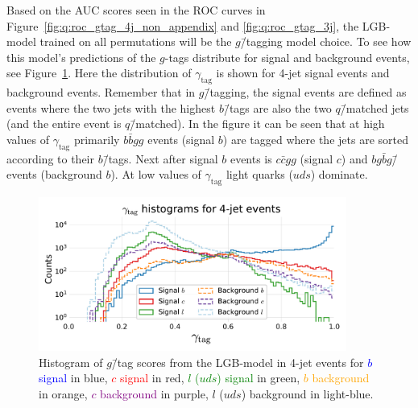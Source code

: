 Based on the AUC scores seen in the ROC curves in Figure~\ref{fig:q:roc_gtag_4j_non_appendix} and \ref{fig:q:roc_gtag_3j}, the LGB-model trained on all permutations will be the $g$\=/tagging model choice. To see how this model's predictions of the $g$-tags distribute for signal and background events, see Figure~\ref{fig:q:gtag_scores_4j_sig_bkg}. Here the distribution of $\gamma_\mathrm{tag}$ is shown for 4-jet signal events and background events. Remember that in $g$\=/tagging, the signal events are defined as events where the two jets with the highest $b$\=/tags are also the two $q$\=/matched jets (and the entire event is $q$\=/matched). In the figure it can be seen that at high values of $\gamma_\mathrm{tag}$ primarily $b\bar{b}gg$ events (signal $b$) are tagged where the jets are sorted according to their $b$\=/tags. Next after signal $b$ events is $c\bar{c}gg$ (signal $c$) and $bg\bar{b}g$\=/events (background $b$). At low values of $\gamma_\mathrm{tag}$ light quarks ($uds$) dominate. 

\begin{figure}[h!]
  \centerfloat
  \includegraphics[width=0.9\textwidth, trim=10 10 10 45, clip]{figures/quarks/gtag-histogram-sigbkg-down_sample=1.00-ML_vars=vertex-selection=b-ejet_min=4-n_iter_RS_lgb=99-n_iter_RS_xgb=9-cdot_cut=0.90-version=19-njet=4.pdf}
  \caption[Distribution of $g$\=/Tag Scores in 4-Jet Events for Signal and Background]
          {Histogram of $g$\=/tag scores from the LGB-model in 4-jet events for \textcolor{blue}{$b$ signal} in blue, \textcolor{red}{$c$ signal} in red, \textcolor{green}{$l$ ($uds$) signal} in green, \textcolor{orange}{$b$ background} in orange, \textcolor{purple}{$c$ background} in purple, \textcolor{light-blue}{$l$ ($uds$) background} in light-blue.} 
  \label{fig:q:gtag_scores_4j_sig_bkg}
\end{figure}
\vspace{-3mm}

